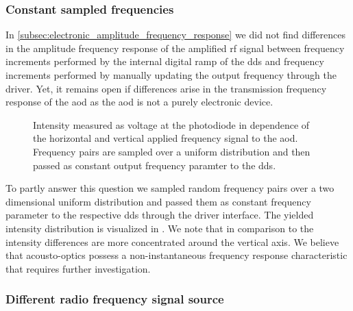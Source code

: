\subsubsection{Constant sampled frequencies}

In \cref{subsec:electronic_amplitude_frequency_response} we did not find
differences in the amplitude frequency response of the amplified \gls{rf}
signal between frequency increments performed by the internal digital ramp of
the \gls{dds} and frequency increments performed by manually updating the
output frequency through the driver. Yet, it remains open if differences
arise in the transmission frequency response of the \gls{aod} as the \gls{aod}
is not a purely electronic device.
\begin{figure}[htb]
  \centering
  \begin{adjustbox}{width=\textwidth}
  \end{adjustbox}
  \caption{Intensity measured as voltage at the photodiode in dependence of
    the horizontal and vertical applied frequency signal to the \gls{aod}.
    Frequency pairs are sampled over a uniform distribution and then passed
    as constant output frequency paramter to the \gls{dds}.
  }\label{fig:intensity_distribution_frequency_sampled}
\end{figure}
To partly answer this question we sampled random frequency pairs over a
two dimensional uniform distribution and passed them as constant frequency
parameter to the respective \gls{dds} through the driver interface. The
yielded intensity distribution is visualized in
. We note that in
comparison to  the intensity
differences are more concentrated around the vertical axis. We believe that
acousto-optics possess a non-instantaneous frequency response characteristic
that requires further investigation.

\subsubsection{Different radio frequency signal source}\label{subsec:different_signal_source}

